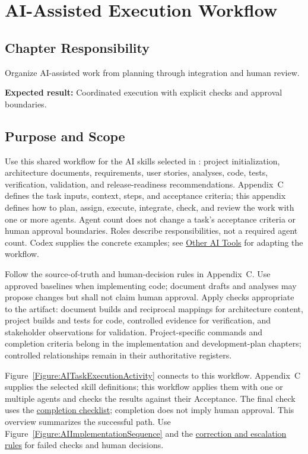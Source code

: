 \chapter{AI-Assisted Execution Workflow}

\section{Chapter Responsibility}
\label{Section:AIImplementationWorkflowResponsibility}
Organize AI-assisted work from planning through integration and human review.

\noindent\textbf{Expected result:} Coordinated execution with explicit checks and approval boundaries.

\section{Purpose and Scope}
\label{Section:AIImplementationPurpose}
Use this shared workflow for the AI skills selected in
: project initialization, architecture documents,
requirements, user stories, analyses, code, tests, verification, validation,
and release-readiness recommendations. Appendix~C defines the task inputs,
context, steps, and acceptance criteria; this appendix defines how to plan,
assign, execute, integrate, check, and review the work with one or more agents.
Agent count does not change a task's acceptance criteria or human approval
boundaries. Roles describe responsibilities, not a required agent count.
Codex supplies the concrete examples; see
\hyperref[Section:AIOtherTools]{Other AI Tools} for adapting the workflow.

Follow the source-of-truth and human-decision rules in Appendix~C. Use approved
baselines when implementing code; document drafts and analyses may propose
changes but shall not claim human approval. Apply checks appropriate to the
artifact: document builds and reciprocal mappings for architecture content,
project builds and tests for code, controlled evidence for verification, and
stakeholder observations for validation. Project-specific commands and
completion criteria belong in the implementation and development-plan
chapters; controlled relationships remain in their authoritative registers.

Figure~\ref{Figure:AITaskExecutionActivity} connects
 to this workflow. Appendix~C supplies the selected
skill definitions; this workflow applies them with one or multiple agents and
checks the results against their Acceptance. The final check uses the
\hyperref[Table:AICompletionChecklist]{completion checklist}; completion does
not imply human approval. This overview summarizes the successful path.
Use Figure~\ref{Figure:AIImplementationSequence} and the
\hyperref[Section:AIImplementationVerification]{correction and escalation rules}
for failed checks and human decisions.

